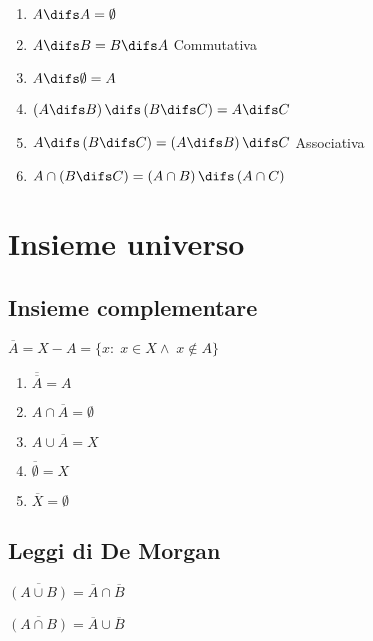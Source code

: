 {\centering
	
\par}
\begin{enumerate}
	\item $A\difs A=\emptyset$
	\item $A\difs B=B\difs A$ Commutativa
	\item $A\difs\emptyset=A$
	\item $\left(A\difs B\right)\difs\left(B\difs C\right)=A\difs C$
	\item $A\difs\left(B\difs C\right)=\left(A\difs B\right)\difs C$ Associativa
	\item $A\cap\left(B\difs C\right)=\left(A\cap B\right)\difs\left(A\cap C\right)$
\end{enumerate}
\chapter{Insieme universo}
\section{Insieme complementare}
{\centering
	
\par}
$\overline{A}=X-A=\lbrace x:\; x\in X\wedge\; x\notin A\rbrace$
\begin{enumerate}
	\item $\overline{\overline{A}}=A$
	\item $A\cap\overline{A}=\emptyset$
	\item $A\cup\overline{A}=X$
	\item $\overline{\emptyset}=X$
	\item $\overline{X}=\emptyset$
\end{enumerate}
\section{Leggi di De Morgan}
$\overline{\left(A\cup B\right)}=\overline{A}\cap\overline{B}$

$\overline{\left(A\cap B\right)}=\overline{A}\cup\overline{B}$